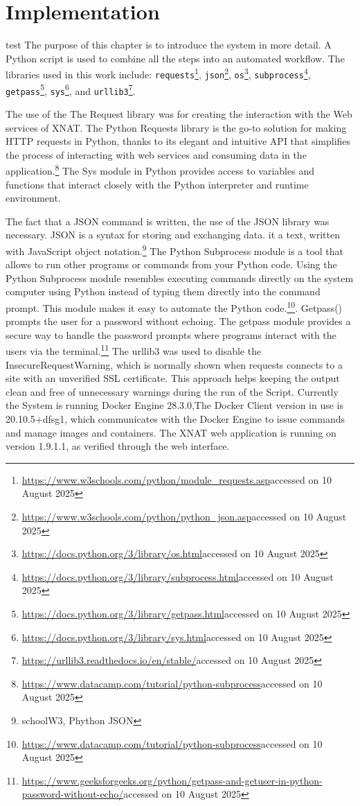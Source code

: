 

\chapter{Implementation}
test
The purpose of this chapter is to introduce the system in more detail. A Python script is used to combine all the steps into an automated workflow. The libraries used in this work include: \texttt{requests}\footnote{\url{https://www.w3schools.com/python/module_requests.asp}accessed on 10 August 2025}, \texttt{json}\footnote{\url{https://www.w3schools.com/python/python_json.asp}accessed on 10 August 2025}, \texttt{os}\footnote{\url{https://docs.python.org/3/library/os.html}accessed on 10 August 2025}, \texttt{subprocess}\footnote{\url{https://docs.python.org/3/library/subprocess.html}accessed on 10 August 2025}, \texttt{getpass}\footnote{\url{https://docs.python.org/3/library/getpass.html}accessed on 10 August 2025}, \texttt{sys}\footnote{\url{https://docs.python.org/3/library/sys.html}accessed on 10 August 2025}, and \texttt{urllib3}\footnote{\url{https://urllib3.readthedocs.io/en/stable/}accessed on 10 August 2025}.

The use of the The Request library was for creating the interaction with the Web services of XNAT. The Python Requests library is the go-to solution for making HTTP requests in Python, thanks to its elegant and intuitive API that simplifies the process of interacting with web services and consuming data in the application.\footnote{\url{https://www.datacamp.com/tutorial/python-subprocess}accessed on 10 August 2025} The Sys module in Python provides access to variables and functions that interact closely with the Python interpreter and runtime environment. 

The fact that a JSON command is written, the use of the JSON library was necessary. JSON is a syntax for storing and exchanging data. it a text, written with JavaScript object notation.\footnote{schoolW3, Phython JSON}
The Python Subprocess module is a tool that allows to run other programs or commands from your Python code. Using the Python Subprocess module resembles executing commands directly on the system computer using Python instead of typing them directly into the command prompt. This module makes it easy to automate the Python code.\footnote{\url{https://www.datacamp.com/tutorial/python-subprocess}accessed on 10 August 2025}. Getpass() prompts the user for a password without echoing. The getpass module provides a secure way to handle the password prompts where programs interact with the users via the terminal.\footnote{\url{https://www.geeksforgeeks.org/python/getpass-and-getuser-in-python-password-without-echo/}accessed on 10 August 2025}
 The urllib3 was used to disable the InsecureRequestWarning, which is normally shown when requests connects to a site with an unverified SSL certificate. This approach helps keeping the output clean and free of unnecessary warnings during the run of the Script.
 Currently the System is running Docker Engine 28.3.0,The Docker Client version in use is 20.10.5+dfsg1, which communicates with the Docker Engine to issue commands and manage images and containers. The XNAT web application is running on version 1.9.1.1, as verified through the web interface. 
 


